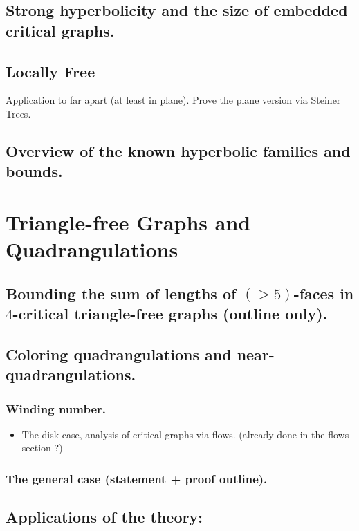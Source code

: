 \documentclass[12pt,twoside,openright,a4paper]{book}
\begin{document}
\section{Strong hyperbolicity and the size of embedded critical graphs.}

\section{Locally Free}

Application to far apart (at least in plane). Prove the plane version via Steiner Trees.

\section{Overview of the known hyperbolic families and bounds.}


\chapter{Triangle-free Graphs and Quadrangulations}\label{chap:trfree}


\section{Bounding the sum of lengths of $(\ge\!5)$-faces in $4$-critical triangle-free graphs (outline only).}
\section{Coloring quadrangulations and near-quadrangulations.}

\subsection{ Winding number.}
\begin{itemize}
\item The disk case, analysis of critical graphs via flows. (already done in the flows section ?)
\end{itemize}

\subsection{The general case (statement + proof outline).}

\section{Applications of the theory:}
\end{document}
